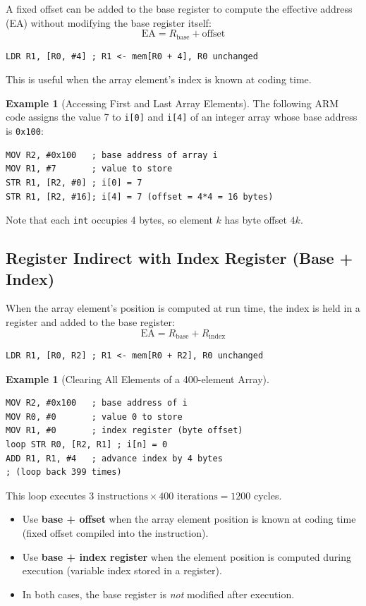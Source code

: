 \documentclass[11pt, a4paper, notitlepage]{report}
\theoremstyle{definition}
\theoremstyle{remark}
\theoremstyle{definition}
\newtheorem{example}[theorem]{Example}
\begin{document}
A fixed offset can be added to the base register to compute the effective address (EA) without modifying the base register itself:
\[
  \text{EA} = R_{\text{base}} + \text{offset}
\]

\begin{lstlisting}
LDR R1, [R0, #4] ; R1 <- mem[R0 + 4], R0 unchanged
\end{lstlisting}

This is useful when the array element's index is known at coding time.

\begin{example}[Accessing First and Last Array Elements]
The following ARM code assigns the value 7 to \texttt{i[0]} and \texttt{i[4]} of an integer array whose base address is \texttt{0x100}:
\begin{lstlisting}
MOV R2, #0x100   ; base address of array i
MOV R1, #7       ; value to store
STR R1, [R2, #0] ; i[0] = 7
STR R1, [R2, #16]; i[4] = 7 (offset = 4*4 = 16 bytes)
\end{lstlisting}
Note that each \texttt{int} occupies 4 bytes, so element $k$ has byte offset $4k$.
\end{example}

\subsection{Register Indirect with Index Register (Base + Index)}

When the array element's position is computed at run time, the index is held in a register and added to the base register:
\[
  \text{EA} = R_{\text{base}} + R_{\text{index}}
\]

\begin{lstlisting}
LDR R1, [R0, R2] ; R1 <- mem[R0 + R2], R0 unchanged
\end{lstlisting}

\begin{example}[Clearing All Elements of a 400-element Array]
\leavevmode
\begin{lstlisting}
MOV R2, #0x100   ; base address of i
MOV R0, #0       ; value 0 to store
MOV R1, #0       ; index register (byte offset)
loop STR R0, [R2, R1] ; i[n] = 0
ADD R1, R1, #4   ; advance index by 4 bytes
; (loop back 399 times)
\end{lstlisting}
This loop executes $3 \text{ instructions} \times 400 \text{ iterations} = 1200$ cycles.
\end{example}

\begin{keyresult}[title={Base + Offset vs.\ Base + Index}]
\begin{itemize}
  \item Use \textbf{base + offset} when the array element position is known at coding time (fixed offset compiled into the instruction).
  \item Use \textbf{base + index register} when the element position is computed during execution (variable index stored in a register).
  \item In both cases, the base register is \emph{not} modified after execution.
\end{itemize}
\end{keyresult}
\end{document}
